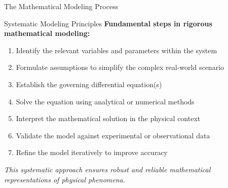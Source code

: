 \documentclass[10pt,aspectratio=169]{beamer}
\newcommand{\concept}[1]{\textbf{#1}}
\newcommand{\emphasis}[1]{\textit{#1}}
\begin{document}
\begin{frame}{The Mathematical Modeling Process}
    \begin{center}
    \end{center}
\end{frame}

\begin{frame}{Systematic Modeling Principles}
    \concept{Fundamental steps in rigorous mathematical modeling:}
    
    
    \begin{enumerate}
        \item Identify the relevant variables and parameters within the system
        \item Formulate assumptions to simplify the complex real-world scenario
        \item Establish the governing differential equation(s)
        \item Solve the equation using analytical or numerical methods
        \item Interpret the mathematical solution in the physical context
        \item Validate the model against experimental or observational data
        \item Refine the model iteratively to improve accuracy
    \end{enumerate}
    
    
    \emphasis{This systematic approach ensures robust and reliable mathematical representations of physical phenomena.}
\end{frame}
\end{document}
